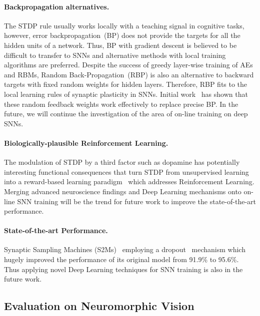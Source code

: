 \paragraph{Backpropagation alternatives.}
The STDP rule usually works locally with a teaching signal in cognitive tasks, however, error backpropagation~(BP) does not provide the targets for all the hidden units of a network.
Thus, BP with gradient descent is believed to be difficult to transfer to SNNs and alternative methods with local training algorithms are preferred.
Despite the success of greedy layer-wise training of AEs and RBMs, Random Back-Propagation~(RBP) is also an alternative to backward targets with fixed random weights for hidden layers.
Therefore, RBP fits to the local learning rules of synaptic plasticity in SNNs.
Initial work~\citep{samadi2017deep,neftci2017event} has shown that these random feedback weights work effectively to replace precise BP.  
In the future, we will continue the investigation of the area of on-line training on deep SNNs.

\paragraph{Biologically-plausible Reinforcement Learning.}
The modulation of STDP by a third factor such as dopamine has potentially interesting functional consequences that turn STDP from unsupervised learning into a reward-based learning paradigm~\citep{izhikevich2007solving} which addresses Reinforcement Learning.
Merging advanced neuroscience findings and Deep Learning mechanisms onto on-line SNN training will be the trend for future work to improve the state-of-the-art performance.


\paragraph{State-of-the-art Performance.}
Synaptic Sampling Machines (S2Ms)~\citep{neftci2016stochastic} employing a dropout~\citep{srivastava2014dropout} mechanism which hugely improved the performance of its original model from 91.9\% to 95.6\%.
Thus applying novel Deep Learning techniques for SNN training is also in the future work.


\subsection{Evaluation on Neuromorphic Vision}

